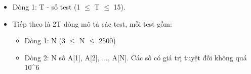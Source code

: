 \begin{itemize}
	\item Dòng 1: T - số test (1  $\le$  T  $\le$  15).
	\item Tiếp theo là 2T dòng mô tả các test, mỗi test gồm:
\begin{itemize}
	\item Dòng 1: N (3  $\le$  N  $\le$  2500)
	\item Dòng 2: N số A[1], A[2], ..., A[N]. Các số có giá trị tuyệt đối không quá 10^6
\end{itemize}
\end{itemize}